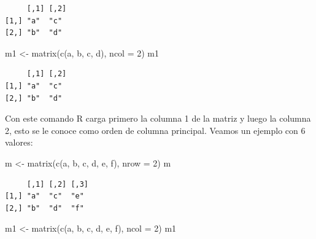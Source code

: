 \documentclass[
  letterpaper,
  DIV=11,
  numbers=noendperiod]{scrartcl}
\newenvironment{Shaded}{\begin{snugshade}}{\end{snugshade}}
\newcommand{\AttributeTok}[1]{\textcolor[rgb]{0.40,0.45,0.13}{#1}}
\newcommand{\DecValTok}[1]{\textcolor[rgb]{0.68,0.00,0.00}{#1}}
\newcommand{\FunctionTok}[1]{\textcolor[rgb]{0.28,0.35,0.67}{#1}}
\newcommand{\NormalTok}[1]{\textcolor[rgb]{0.00,0.23,0.31}{#1}}
\newcommand{\OtherTok}[1]{\textcolor[rgb]{0.00,0.23,0.31}{#1}}
\newcommand{\StringTok}[1]{\textcolor[rgb]{0.13,0.47,0.30}{#1}}
\begin{document}
\begin{verbatim}
     [,1] [,2]
[1,] "a"  "c" 
[2,] "b"  "d" 
\end{verbatim}

\begin{Shaded}
\begin{Highlighting}[]
\NormalTok{m1 }\OtherTok{\textless{}{-}} \FunctionTok{matrix}\NormalTok{(}\FunctionTok{c}\NormalTok{(}\StringTok{\textquotesingle{}a\textquotesingle{}}\NormalTok{, }\StringTok{\textquotesingle{}b\textquotesingle{}}\NormalTok{, }\StringTok{\textquotesingle{}c\textquotesingle{}}\NormalTok{, }\StringTok{\textquotesingle{}d\textquotesingle{}}\NormalTok{), }\AttributeTok{ncol =} \DecValTok{2}\NormalTok{)}
\NormalTok{m1}
\end{Highlighting}
\end{Shaded}

\begin{verbatim}
     [,1] [,2]
[1,] "a"  "c" 
[2,] "b"  "d" 
\end{verbatim}

Con este comando R carga primero la columna 1 de la matriz y luego la
columna 2, esto se le conoce como orden de columna principal. Veamos un
ejemplo con 6 valores:

\begin{Shaded}
\begin{Highlighting}[]
\NormalTok{m }\OtherTok{\textless{}{-}} \FunctionTok{matrix}\NormalTok{(}\FunctionTok{c}\NormalTok{(}\StringTok{\textquotesingle{}a\textquotesingle{}}\NormalTok{, }\StringTok{\textquotesingle{}b\textquotesingle{}}\NormalTok{, }\StringTok{\textquotesingle{}c\textquotesingle{}}\NormalTok{, }\StringTok{\textquotesingle{}d\textquotesingle{}}\NormalTok{, }\StringTok{\textquotesingle{}e\textquotesingle{}}\NormalTok{, }\StringTok{\textquotesingle{}f\textquotesingle{}}\NormalTok{), }\AttributeTok{nrow =} \DecValTok{2}\NormalTok{)}
\NormalTok{m}
\end{Highlighting}
\end{Shaded}

\begin{verbatim}
     [,1] [,2] [,3]
[1,] "a"  "c"  "e" 
[2,] "b"  "d"  "f" 
\end{verbatim}

\begin{Shaded}
\begin{Highlighting}[]
\NormalTok{m1 }\OtherTok{\textless{}{-}} \FunctionTok{matrix}\NormalTok{(}\FunctionTok{c}\NormalTok{(}\StringTok{\textquotesingle{}a\textquotesingle{}}\NormalTok{, }\StringTok{\textquotesingle{}b\textquotesingle{}}\NormalTok{, }\StringTok{\textquotesingle{}c\textquotesingle{}}\NormalTok{, }\StringTok{\textquotesingle{}d\textquotesingle{}}\NormalTok{, }\StringTok{\textquotesingle{}e\textquotesingle{}}\NormalTok{, }\StringTok{\textquotesingle{}f\textquotesingle{}}\NormalTok{), }\AttributeTok{ncol =} \DecValTok{2}\NormalTok{)}
\NormalTok{m1}
\end{Highlighting}
\end{Shaded}
\end{document}
